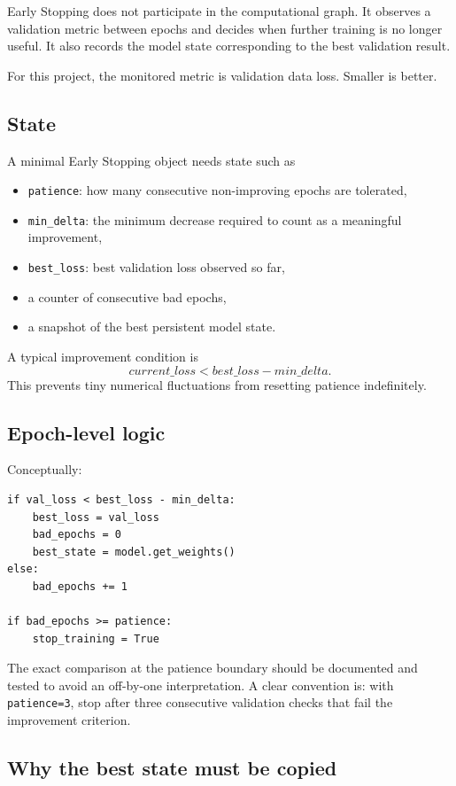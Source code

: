 \documentclass[11pt,a4paper]{article}
\newcommand{\code}[1]{\texttt{#1}}
\begin{document}
Early Stopping does not participate in the computational graph. It observes a validation metric between epochs and decides when further training is no longer useful. It also records the model state corresponding to the best validation result.

For this project, the monitored metric is validation data loss. Smaller is better.

\subsection{State}

A minimal Early Stopping object needs state such as
\begin{itemize}
    \item \code{patience}: how many consecutive non-improving epochs are tolerated,
    \item \code{min\_delta}: the minimum decrease required to count as a meaningful improvement,
    \item \code{best\_loss}: best validation loss observed so far,
    \item a counter of consecutive bad epochs,
    \item a snapshot of the best persistent model state.
\end{itemize}

A typical improvement condition is
\[
current\_loss < best\_loss-min\_delta.
\]
This prevents tiny numerical fluctuations from resetting patience indefinitely.

\subsection{Epoch-level logic}

Conceptually:
\begin{lstlisting}
if val_loss < best_loss - min_delta:
    best_loss = val_loss
    bad_epochs = 0
    best_state = model.get_weights()
else:
    bad_epochs += 1

if bad_epochs >= patience:
    stop_training = True
\end{lstlisting}

The exact comparison at the patience boundary should be documented and tested to avoid an off-by-one interpretation. A clear convention is: with \code{patience=3}, stop after three consecutive validation checks that fail the improvement criterion.

\subsection{Why the best state must be copied}
\end{document}

